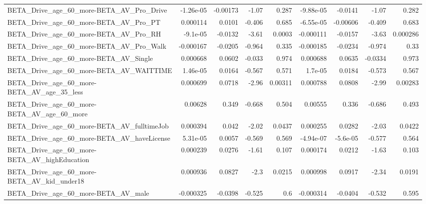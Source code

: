 \begin{tabular}{lrrrrrrrr}
BETA\_Drive\_age\_60\_more-BETA\_AV\_Pro\_Drive           &   -1.26e-05 &     -0.00173 &     -1.07 &    0.287 &  -9.88e-05 &     -0.0141 &        -1.07 &         0.282 \\
BETA\_Drive\_age\_60\_more-BETA\_AV\_Pro\_PT              &    0.000114 &       0.0101 &    -0.406 &    0.685 &  -6.55e-05 &    -0.00606 &       -0.409 &         0.683 \\
BETA\_Drive\_age\_60\_more-BETA\_AV\_Pro\_RH              &    -9.1e-05 &      -0.0132 &     -3.61 &   0.0003 &  -0.000111 &     -0.0157 &        -3.63 &      0.000286 \\
BETA\_Drive\_age\_60\_more-BETA\_AV\_Pro\_Walk            &   -0.000167 &      -0.0205 &    -0.964 &    0.335 &  -0.000185 &     -0.0234 &       -0.974 &          0.33 \\
BETA\_Drive\_age\_60\_more-BETA\_AV\_Single              &    0.000668 &       0.0602 &    -0.033 &    0.974 &   0.000688 &      0.0635 &      -0.0334 &         0.973 \\
BETA\_Drive\_age\_60\_more-BETA\_AV\_WAITTIME            &    1.46e-05 &       0.0164 &    -0.567 &    0.571 &    1.7e-05 &      0.0184 &       -0.573 &         0.567 \\
BETA\_Drive\_age\_60\_more-BETA\_AV\_age\_35\_less         &    0.000699 &       0.0718 &     -2.96 &  0.00311 &   0.000788 &      0.0808 &        -2.99 &       0.00283 \\
BETA\_Drive\_age\_60\_more-BETA\_AV\_age\_60\_more         &     0.00628 &        0.349 &    -0.668 &    0.504 &    0.00555 &       0.336 &       -0.686 &         0.493 \\
BETA\_Drive\_age\_60\_more-BETA\_AV\_fulltimeJob         &    0.000394 &        0.042 &     -2.02 &   0.0437 &   0.000255 &      0.0282 &        -2.03 &        0.0422 \\
BETA\_Drive\_age\_60\_more-BETA\_AV\_haveLicense         &    5.31e-05 &       0.0057 &    -0.569 &    0.569 &  -4.94e-07 &    -5.6e-05 &       -0.577 &         0.564 \\
BETA\_Drive\_age\_60\_more-BETA\_AV\_highEducation       &    0.000239 &       0.0276 &     -1.61 &    0.107 &   0.000174 &      0.0212 &        -1.63 &         0.103 \\
BETA\_Drive\_age\_60\_more-BETA\_AV\_kid\_under18         &    0.000936 &       0.0827 &      -2.3 &   0.0215 &   0.000998 &      0.0917 &        -2.34 &        0.0191 \\
BETA\_Drive\_age\_60\_more-BETA\_AV\_male                &   -0.000325 &      -0.0398 &    -0.525 &      0.6 &  -0.000314 &     -0.0404 &       -0.532 &         0.595 \\

\end{tabular}
